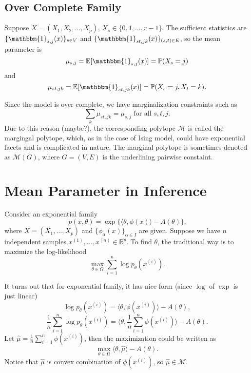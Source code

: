 \documentclass[11pt]{article}
\newcommand{\Mc}{\mathcal{M}}
\newcommand{\E}{\mathbb{E}}
\newcommand{\R}{\mathbb{R}}
\newcommand{\prob}{\mathbb{P}}
\newcommand{\1}{\mathbbm{1}}
\begin{document}
\subsection{Over Complete Family}
Suppose $X = (X_1, X_2, \ldots, X_p)$, $X_s \in \{0, 1, \ldots, r-1\}$. The sufficient statistics are
$\{\1_{s,j}(x)\}_{s\in V}$ and $\{\1_{st,jk}(x)\}_{(s,t) \in E}$, so the mean parameter is
\[
\mu_{s,j} = \E[\1_{s,j}(x)] = \prob(X_s = j)
\]
and
\[
\mu_{st,jk} = \E[\1_{st,jk}(x)] = \prob(X_s = j, X_t = k).
\]

Since the model is over complete, we have marginalization constraints such as
\[
\sum_k \mu_{st,jk} = \mu_{s,j} \text{ for all } s,t,j.
\]
Due to this reason (maybe?), the corresponding polytope $\Mc$ is called the margingal polytope, which,
as in the case of Ising model, could have exponential facets and is complicated in nature. The marginal
polytope is sometimes denoted as $\Mc(G)$, where $G=(V, E)$ is the underlining pairwise constaint.

\section{Mean Parameter in Inference}
Consider an exponential family
\[
p(x, \theta) = \exp\{\langle \theta, \phi(x) \rangle - A(\theta)\}.
\]
where $X = (X_1, \ldots, X_p)$ and $\{\phi_\alpha(x)\}_{\alpha \in I}$ are given. Suppose we have $n$
independent samples $x^{(1)}, \ldots, x^{(n)} \in \R^p$. To find $\theta$, the traditional way is to
maximize the log-likelihood
\[
\max_{\theta \in \Omega} \sum_{i=1}^n \log p_\theta(x^{(i)}).
\]

It turns out that for exponential family, it has nice form (since $\log$ of $\exp$ is just linear)
\[
\log p_\theta(x^{(i)}) = \langle \theta, \phi(x^{(i)}) \rangle - A(\theta),
\]
\[
\frac{1}{n} \sum_{i=1}^n \log p_\theta(x^{(i)})
= \langle \theta, \frac{1}{n} \sum_{i=1}^n \phi(x^{(i)}) \rangle - A(\theta).
\]
Let $\hat{\mu} = \frac{1}{n} \sum_{i=1}^n \phi(x^{(i)})$, then the maximization could be written as
\[
\max_{\theta \in \Omega} \langle \theta, \hat{\mu} \rangle - A(\theta).
\]
Notice that $\hat{\mu}$ is convex combination of $\phi(x^{(i)})$, so $\hat{\mu} \in \Mc$.
\end{document}
